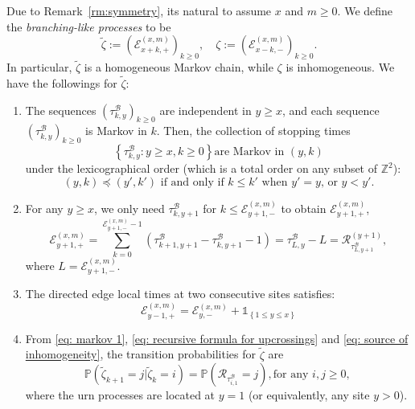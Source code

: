 \documentclass[EJP]{ejpecp} %
\begin{document}
Due to Remark~\ref{rm:symmetry}, its natural to assume $x$ and $m \ge 0$. We define the \textit{branching-like processes} to be
\[
\tilde{\zeta} := \left(\mathcal{E}^{(x,m)}_{x+k,+} \right)_{k\geq 0}, \quad
\zeta := \left(\mathcal{E}^{(x,m)}_{x-k,-} \right)_{k\geq 0}
.\]
In particular, $\tilde{\zeta}$ is a homogeneous Markov chain, while $\zeta$ is inhomogeneous. We have the followings for 	$\tilde{\zeta}$:
\begin{enumerate}
	\item The sequences $(\tau^{\mathcal{B}}_{k,y})_{k\geq 0} $ are independent in $y \geq x$, and each sequence $\left(\tau^{\mathcal{B}}_{k,y}\right)_{k\geq 0} $ is Markov in $k$. Then, the collection of stopping times
	\begin{equation}\label{eq: markov 1} 
		\left\{\tau^{\mathcal{B}}_{k,y}: y\geq x, k\geq 0 \right\} \mbox{are Markov in $(y,k)$}
	\end{equation}
	under the lexicographical order (which is a total order on any subset of $\mathbb{Z}^2$): 
	\begin{equation*}\label{eq: lexicographical order}
		(y,k) \preceq (y',k')  \mbox{ if and only if }
		k \leq k'   \mbox{ when $y' = y$, or } 
		y <y'. 
	\end{equation*} 
	
	\item For any $y\geq x$, we only need $\tau^{\mathcal{B}}_{k,y+1}$ for $k\leq \mathcal{E}^{(x,m)}_{y+1,-}$ to obtain $\mathcal{E}^{(x,m)}_{y+1,+}$,
	\begin{equation} \label{eq: recursive formula for upcrossings}
		\mathcal{E}_{y+1,+}^{(x,m)}	=  \sum_{k= 0 }^{\mathcal{E}_{y+1,-}^{(x,m)}-1}	\left(\tau^{\mathcal{B}}_{k+1,y+1}-\tau^{\mathcal{B}}_{k,y+1}-1 \right) = \tau^{\mathcal{B}}_{ L,y } - L = \mathcal{R}^{(y + 1)}_{\tau^{\mathcal{B}}_{ L,y+1 }},
	\end{equation}
	where $L = \mathcal{E}_{y+1,-}^{(x,m)}$.
	
	\item The directed edge local times at two consecutive sites satisfies:
	\begin{equation}\label{eq: source of inhomogeneity}
		\mathcal{E}_{y-1,+}^{(x,m)} = \mathcal{E}_{y,-}^{(x,m)} + \mathbb{1}_{ \left\{ 1\leq y \leq x \right\} }
	\end{equation}
	
	\item  From \eqref{eq: markov 1}, \eqref{eq: recursive formula for upcrossings} and \eqref{eq: source of inhomogeneity}, the transition probabilities for $\tilde{\zeta}$ are 
	\begin{equation}\label{eq: transition prob on positive}
		\mathbb{P}\left(\tilde{\zeta}_{k+1}=j \vert \tilde{\zeta}_k =i  \right) = 
		\mathbb{P}\left( \mathcal{R}_{\tau_{i,1}^{\mathcal{B}}} = j \right), \mbox{for any $i,j\geq 0$, } 
	\end{equation} 
	where the urn processes are located at $y = 1$ (or equivalently, any site $y>0$).
\end{enumerate}
\end{document}
